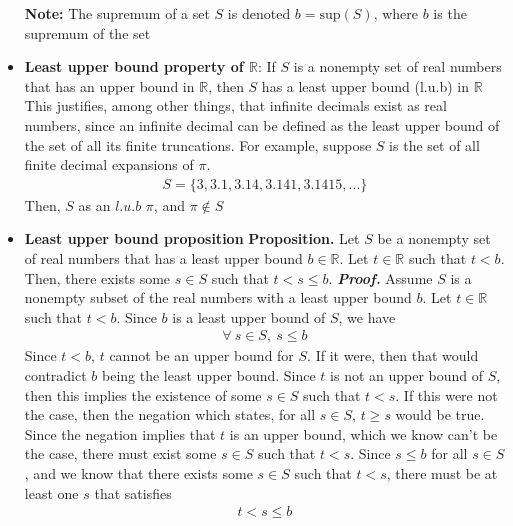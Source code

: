 \documentclass{report}
\begin{document}
\begin{itemize}
\begin{enumerate}
            \end{enumerate}
            \bigbreak \noindent 
            \textbf{Note:} The supremum of a set $S$ is denoted $ b = \text{sup}(S)$, where $b$ is the supremum of the set
        \item \textbf{Least upper bound property of $\mathbb{R}$}: If $S$ is a nonempty set of real numbers that has an upper bound in $\mathbb{R}$, then $S$ has a least upper bound (l.u.b) in $\mathbb{R} $
            \bigbreak \noindent 
            This justifies, among other things, that infinite decimals exist as real numbers, since an infinite decimal can be defined as the least upper bound of the set of all its finite truncations. For example, suppose $S$ is the set of all finite decimal expansions of $\pi$.
            \begin{align*}
                S = \{3,3.1,3.14,3.141, 3.1415,...\}
            \end{align*}
            Then, $S$ as an $l.u.b$ $\pi$, and $\pi\not\in S $
        \item \textbf{Least upper bound proposition}
            \bigbreak \noindent 
            \textbf{Proposition.} Let $S$ be a nonempty set of real numbers that has a least upper bound $b \in \mathbb{R}$. Let $t \in \mathbb{R}$ such that $t < b$. Then, there exists some $s \in S$ such that $t < s \leq b$.
            \bigbreak \noindent 
            \textbf{\textit{Proof.}} Assume $S$ is a nonempty subset of the real numbers with a least upper bound $b$. Let $t\in \mathbb{R}$ such that $t<b$. Since $b$ is a least upper bound of $S$, we have
            \begin{align*}
                \forall \ s \in S,\ s \leq b 
            \end{align*}
            Since $t< b$, $t$ cannot be an upper bound for $S$. If it were, then that would contradict $b$ being the least upper bound. Since $t$ is not an upper bound of $S$, then this implies the existence of some $s\in S$ such that $ t< s$. If this were not the case, then the negation which states, for all $s\in S$, $t \geq s$ would be true. Since the negation implies that $t$ is an upper bound, which we know can't be the case, there must exist some $s\in S$ such that $t < s$. 
            \bigbreak \noindent 
            Since $s \leq b$ for all $s\in S$, and we know that there exists some $s \in S$ such that $t < s$, there must be at least one $s$ that satisfies
            \begin{align*}
                t < s \leq b
            \end{align*}

\end{itemize}
\end{document}
